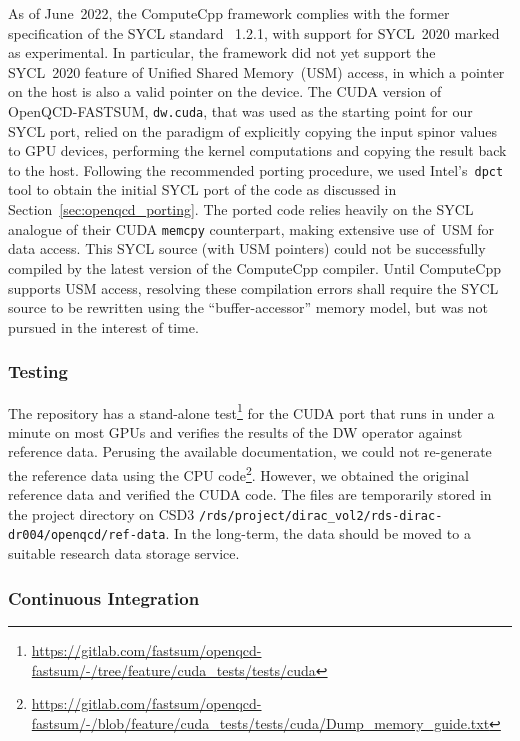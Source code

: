 \documentclass[../main]{subfiles}
\begin{document}
As of June~2022, the ComputeCpp framework complies with the former specification of the SYCL standard \viz~1.2.1, with support for SYCL~2020 marked as experimental.
In particular, the framework did not yet support the SYCL~2020 feature of Unified Shared Memory~(USM) access, in which a pointer on the host is also a valid pointer on the device.
The CUDA version of OpenQCD-FASTSUM, \texttt{dw.cuda}, that was used as the starting point for our SYCL port, relied on the paradigm of explicitly copying the input spinor values to GPU devices, performing the kernel computations and copying the result back to the host.
Following the recommended porting procedure, we used Intel's~\texttt{dpct} tool to obtain the initial SYCL port of the code as discussed in Section~\ref{sec:openqcd_porting}.
The ported code relies heavily on the SYCL analogue of their CUDA \texttt{memcpy} counterpart, making extensive use of~USM for data access.
This SYCL source (with USM pointers) could not be successfully compiled by the latest version of the ComputeCpp compiler.
Until ComputeCpp supports USM access, resolving these compilation errors shall require the SYCL source to be rewritten using the ``buffer-accessor'' memory model, but was not pursued in the interest of time.


\subsubsection{Testing}\label{testing_openqcd}

The repository has a stand-alone test\footnote{\url{https://gitlab.com/fastsum/openqcd-fastsum/-/tree/feature/cuda_tests/tests/cuda}} for the CUDA port that runs in under a minute on most GPUs and verifies the results of the DW operator against reference data.
Perusing the available documentation, we could not re-generate the reference data using the CPU code\footnote{\url{https://gitlab.com/fastsum/openqcd-fastsum/-/blob/feature/cuda_tests/tests/cuda/Dump_memory_guide.txt}}.
However, we obtained the original reference data and verified the CUDA code.
The files are temporarily stored in the project directory on CSD3 \texttt{/rds/project/dirac\_vol2/rds-dirac-dr004/openqcd/ref-data}.
In the long-term, the data should be moved to a suitable research data storage service.

\subsubsection{Continuous Integration}
\end{document}
